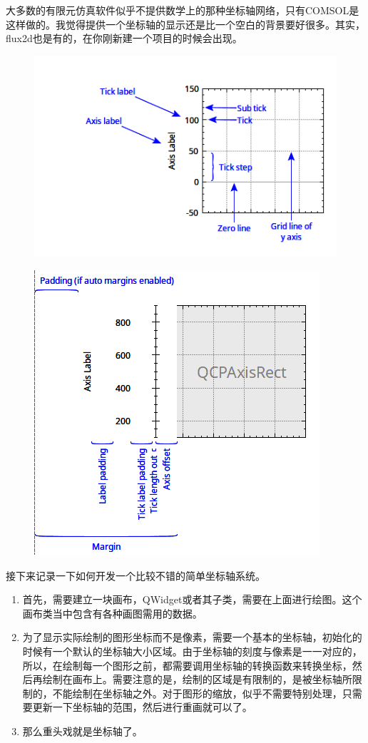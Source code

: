 大多数的有限元仿真软件似乎不提供数学上的那种坐标轴网络，只有COMSOL是这样做的。我觉得提供一个坐标轴的显示还是比一个空白的背景要好很多。其实，flux2d也是有的，在你刚新建一个项目的时候会出现。
\begin{figure}
	\centering
	\includegraphics[width=0.7\linewidth]{figures/AxisNamesOverview}
	\caption{}
	\label{fig:axisnamesoverview}
\end{figure}
\begin{figure}
	\centering
	\includegraphics[width=0.7\linewidth]{figures/AxisRectSpacingOverview}
	\caption{}
	\label{fig:axisrectspacingoverview}
\end{figure}

接下来记录一下如何开发一个比较不错的简单坐标轴系统。

\begin{enumerate}
	\item 首先，需要建立一块画布，QWidget或者其子类，需要在上面进行绘图。这个画布类当中包含有各种画图需用的数据。
	\item 为了显示实际绘制的图形坐标而不是像素，需要一个基本的坐标轴，初始化的时候有一个默认的坐标轴大小区域。由于坐标轴的刻度与像素是一一对应的，所以，在绘制每一个图形之前，都需要调用坐标轴的转换函数来转换坐标，然后再绘制在画布上。需要注意的是，绘制的区域是有限制的，是被坐标轴所限制的，不能绘制在坐标轴之外。对于图形的缩放，似乎不需要特别处理，只需要更新一下坐标轴的范围，然后进行重画就可以了。
	\item 那么重头戏就是坐标轴了。
\end{enumerate}

